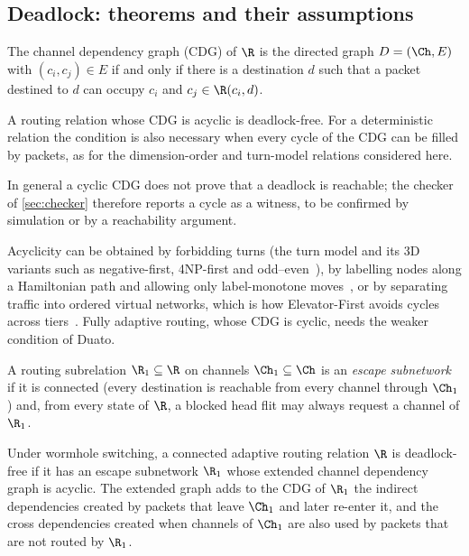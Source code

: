 \subsection{Deadlock: theorems and their assumptions}
\label{sec:bg-deadlock}

\begin{definition}\label{def:cdg}
The channel dependency graph (CDG) of $\R$ is the directed graph $D=(\Ch,E)$ with $(c_i,c_j)\in E$ if and only if there is a destination $d$ such that a packet destined to $d$ can occupy $c_i$ and $c_j\in\R(c_i,d)$.
\end{definition}

\begin{theorem}\label{thm:dally}
A routing relation whose CDG is acyclic is deadlock-free. For a deterministic relation the condition is also necessary when every cycle of the CDG can be filled by packets, as for the dimension-order and turn-model relations considered here.
\end{theorem}

In general a cyclic CDG does not prove that a deadlock is reachable; the checker of \cref{sec:checker} therefore reports a cycle as a witness, to be confirmed by simulation or by a reachability argument.

Acyclicity can be obtained by forbidding turns (the turn model and its 3D variants such as negative-first, 4NP-first and odd--even~\cite{glass1992turn,chiu2000oddeven,pasricha2011lowoverhead}), by labelling nodes along a Hamiltonian path and allowing only label-monotone moves~\cite{lin1994hamiltonian,ebrahimi2013hamfa}, or by separating traffic into ordered virtual networks, which is how Elevator-First avoids cycles across tiers~\cite{dubois2013elevator}. Fully adaptive routing, whose CDG is cyclic, needs the weaker condition of Duato.

\begin{definition}\label{def:escape}
A routing subrelation $\R_1\subseteq\R$ on channels $\Ch_1\subseteq\Ch$ is an \emph{escape subnetwork} if it is connected (every destination is reachable from every channel through $\Ch_1$) and, from every state of $\R$, a blocked head flit may always request a channel of $\R_1$.
\end{definition}

\begin{theorem}\label{thm:duato}
Under wormhole switching, a connected adaptive routing relation $\R$ is deadlock-free if it has an escape subnetwork $\R_1$ whose extended channel dependency graph is acyclic. The extended graph adds to the CDG of $\R_1$ the indirect dependencies created by packets that leave $\Ch_1$ and later re-enter it, and the cross dependencies created when channels of $\Ch_1$ are also used by packets that are not routed by $\R_1$.
\end{theorem}

